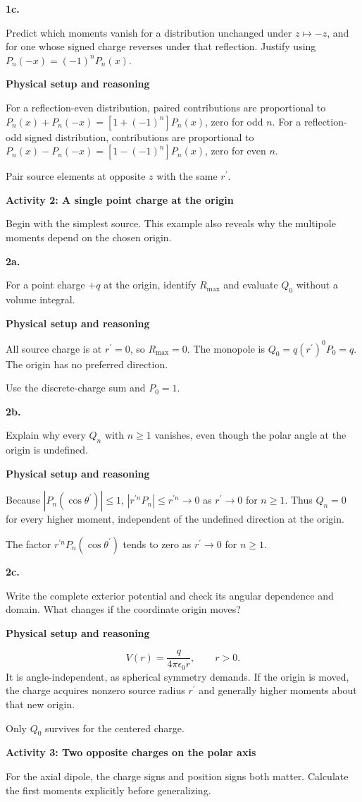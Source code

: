 \documentclass[11pt]{article}
\newcommand{\topic}[1]{\par{\Large\bfseries\color{navy}#1}\par}
\newcommand{\q}[2]{\par\bigskip\noindent\textbf{\color{navy}#1}\par\smallskip #2\par\medskip}
\newcommand{\bridge}[1]{\begin{tcolorbox}[colback=white,colframe=amber,title=Physical starting point,fonttitle=\bfseries,boxrule=.5pt,breakable]#1\end{tcolorbox}}
\newcommand{\stage}[1]{\par\medskip\noindent\textbf{\color{blue}#1}\par\smallskip}
\newcommand{\connect}[1]{\begin{tcolorbox}[colback=blue!4,colframe=blue!45,title=Keep the thread,fonttitle=\bfseries,boxrule=.45pt,breakable]#1\end{tcolorbox}}
\begin{document}
\q{1c.}{Predict which moments vanish for a distribution unchanged under $z\mapsto-z$, and for one whose signed charge reverses under that reflection. Justify using $P_n(-x)=(-1)^nP_n(x)$.}
\stage{Physical setup and reasoning}

For a reflection-even distribution, paired contributions are proportional to $P_n(x)+P_n(-x)=[1+(-1)^n]P_n(x)$, zero for odd $n$. For a reflection-odd signed distribution, contributions are proportional to $P_n(x)-P_n(-x)=[1-(-1)^n]P_n(x)$, zero for even $n$.
\connect{Pair source elements at opposite $z$ with the same $r^\prime$.}

\newpage
\topic{Activity 2: A single point charge at the origin}
\bridge{Begin with the simplest source. This example also reveals why the multipole moments depend on the chosen origin.}

\q{2a.}{For a point charge $+q$ at the origin, identify $R_{\max}$ and evaluate $Q_0$ without a volume integral.}
\stage{Physical setup and reasoning}

All source charge is at $r^\prime=0$, so $R_{\max}=0$. The monopole is $Q_0=q(r^\prime)^0P_0=q$. The origin has no preferred direction.
\connect{Use the discrete-charge sum and $P_0=1$.}

\q{2b.}{Explain why every $Q_n$ with $n\ge1$ vanishes, even though the polar angle at the origin is undefined.}
\stage{Physical setup and reasoning}

Because $|P_n(\cos\theta^\prime)|\le1$, $|r^{\prime n}P_n|\le r^{\prime n}\to0$ as $r^\prime\to0$ for $n\ge1$. Thus $Q_n=0$ for every higher moment, independent of the undefined direction at the origin.
\connect{The factor $r^{\prime n}P_n(\cos\theta^\prime)$ tends to zero as $r^\prime\to0$ for $n\ge1$.}

\q{2c.}{Write the complete exterior potential and check its angular dependence and domain. What changes if the coordinate origin moves?}
\stage{Physical setup and reasoning}


\[\boxed{V(r)=\frac{q}{4\pi\epsilon_0r}},\qquad r>0.\]
 It is angle-independent, as spherical symmetry demands. If the origin is moved, the charge acquires nonzero source radius $r^\prime$ and generally higher moments about that new origin.
\connect{Only $Q_0$ survives for the centered charge.}

\newpage
\topic{Activity 3: Two opposite charges on the polar axis}
\bridge{For the axial dipole, the charge signs and position signs both matter. Calculate the first moments explicitly before generalizing.}
\end{document}

